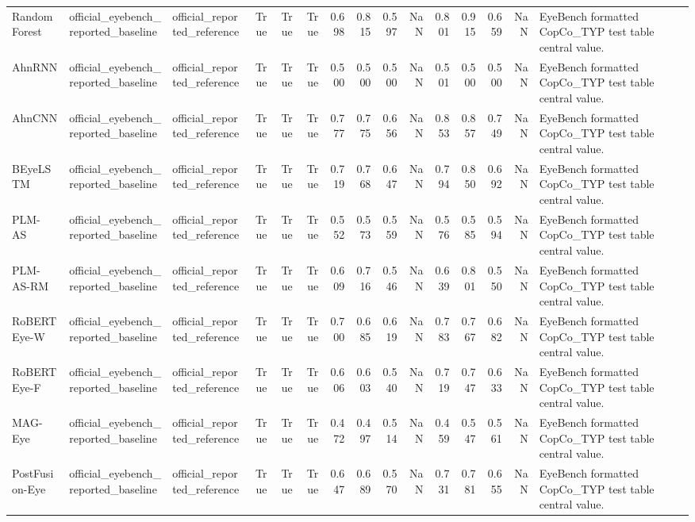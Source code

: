 \begin{tabular}{lllrrrrrrrrrrrl}
Random Forest~\cite{makowski2024detection} & official_eyebench_reported_baseline & official_reported_reference & True & True & True & 0.698 & 0.815 & 0.597 & NaN & 0.801 & 0.915 & 0.659 & NaN & EyeBench formatted CopCo_TYP test table central value. \\
AhnRNN~\citep{ahn2020towards} & official_eyebench_reported_baseline & official_reported_reference & True & True & True & 0.500 & 0.500 & 0.500 & NaN & 0.501 & 0.500 & 0.500 & NaN & EyeBench formatted CopCo_TYP test table central value. \\
AhnCNN~\citep{ahn2020towards} & official_eyebench_reported_baseline & official_reported_reference & True & True & True & 0.777 & 0.775 & 0.656 & NaN & 0.853 & 0.857 & 0.749 & NaN & EyeBench formatted CopCo_TYP test table central value. \\
BEyeLSTM~\citep{reich_inferring_2022} & official_eyebench_reported_baseline & official_reported_reference & True & True & True & 0.719 & 0.768 & 0.647 & NaN & 0.794 & 0.850 & 0.692 & NaN & EyeBench formatted CopCo_TYP test table central value. \\
PLM-AS~\citep{Yang2023PLMASPL} & official_eyebench_reported_baseline & official_reported_reference & True & True & True & 0.552 & 0.573 & 0.559 & NaN & 0.576 & 0.585 & 0.594 & NaN & EyeBench formatted CopCo_TYP test table central value. \\
PLM-AS-RM~\citep{haller2022eye} & official_eyebench_reported_baseline & official_reported_reference & True & True & True & 0.609 & 0.716 & 0.546 & NaN & 0.639 & 0.801 & 0.550 & NaN & EyeBench formatted CopCo_TYP test table central value. \\
RoBERTEye-W~\citep{Shubi2024Finegrained} & official_eyebench_reported_baseline & official_reported_reference & True & True & True & 0.700 & 0.685 & 0.619 & NaN & 0.783 & 0.767 & 0.682 & NaN & EyeBench formatted CopCo_TYP test table central value. \\
RoBERTEye-F~\citep{Shubi2024Finegrained} & official_eyebench_reported_baseline & official_reported_reference & True & True & True & 0.606 & 0.603 & 0.540 & NaN & 0.719 & 0.747 & 0.633 & NaN & EyeBench formatted CopCo_TYP test table central value. \\
MAG-Eye~\citep{Shubi2024Finegrained} & official_eyebench_reported_baseline & official_reported_reference & True & True & True & 0.472 & 0.497 & 0.514 & NaN & 0.459 & 0.547 & 0.561 & NaN & EyeBench formatted CopCo_TYP test table central value. \\
PostFusion-Eye~\citep{Shubi2024Finegrained} & official_eyebench_reported_baseline & official_reported_reference & True & True & True & 0.647 & 0.689 & 0.570 & NaN & 0.731 & 0.781 & 0.655 & NaN & EyeBench formatted CopCo_TYP test table central value. \\
\bottomrule
\end{tabular}
